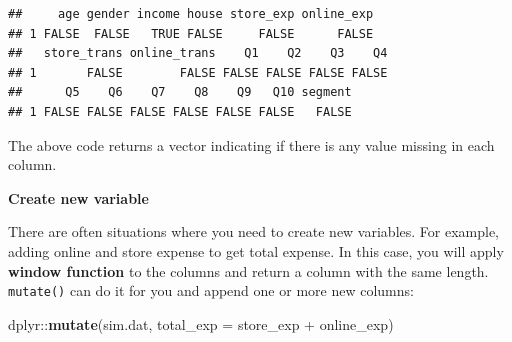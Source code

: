 \documentclass[12pt,]{krantz}
\newenvironment{Shaded}{\begin{snugshade}}{\end{snugshade}}
\newcommand{\KeywordTok}[1]{\textcolor[rgb]{0.13,0.29,0.53}{\textbf{{#1}}}}
\newcommand{\DataTypeTok}[1]{\textcolor[rgb]{0.13,0.29,0.53}{{#1}}}
\newcommand{\StringTok}[1]{\textcolor[rgb]{0.31,0.60,0.02}{{#1}}}
\newcommand{\NormalTok}[1]{{#1}}
\theoremstyle{definition}
\theoremstyle{definition}
\theoremstyle{remark}
\begin{document}
\begin{verbatim}
##     age gender income house store_exp online_exp
## 1 FALSE  FALSE   TRUE FALSE     FALSE      FALSE
##   store_trans online_trans    Q1    Q2    Q3    Q4
## 1       FALSE        FALSE FALSE FALSE FALSE FALSE
##      Q5    Q6    Q7    Q8    Q9   Q10 segment
## 1 FALSE FALSE FALSE FALSE FALSE FALSE   FALSE
\end{verbatim}

The above code returns a vector indicating if there is any value missing
in each column.

\textbf{Create new variable}

There are often situations where you need to create new variables. For
example, adding online and store expense to get total expense. In this
case, you will apply \textbf{window function} to the columns and return
a column with the same length. \texttt{mutate()} can do it for you and
append one or more new columns:

\begin{Shaded}
\begin{Highlighting}[]
\NormalTok{dplyr::}\KeywordTok{mutate}\NormalTok{(sim.dat, }\DataTypeTok{total_exp =} \NormalTok{store_exp +}\StringTok{ }\NormalTok{online_exp)}
\end{Highlighting}
\end{Shaded}
\end{document}
